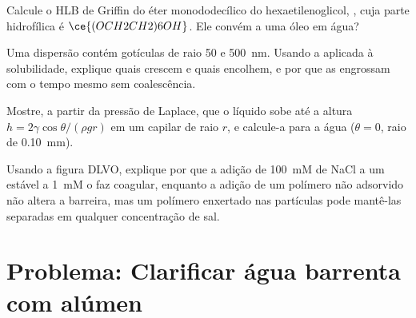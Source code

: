 \begin{exercise}[$\star\star$]\label{exo:b3:colloids:9}
Calcule o HLB de Griffin do éter monododecílico do hexaetilenoglicol,
, cuja parte hidrofílica é $\ce{(OCH2CH2)6OH}$. Ele convém a uma
 óleo em água?
\end{exercise}

\begin{exercise}[$\star\star\star$]\label{exo:b3:colloids:10}
Uma dispersão contém gotículas de raio 50 e \qty{500}{nm}. Usando a 
aplicada à solubilidade, explique quais crescem e quais encolhem, e por que as
 engrossam com o tempo mesmo sem coalescência.
\end{exercise}

\begin{exercise}[$\star\star\star$]\label{exo:b3:colloids:11}
Mostre, a partir da pressão de Laplace, que o líquido sobe até a altura $h = 2\gamma\cos\theta/(\rho gr)$ em um
capilar de raio $r$, e calcule-a para a água ($\theta = 0$, raio de \qty{0.10}{mm}).
\end{exercise}

\begin{exercise}[$\star\star\star$]\label{exo:b3:colloids:12}
Usando a figura DLVO, explique por que a adição de \qty{100}{mM} de NaCl a um  estável
a \qty{1}{mM} o faz coagular, enquanto a adição de um polímero não adsorvido não altera a
barreira, mas um polímero enxertado nas partículas pode mantê-las separadas em qualquer
concentração de sal.
\end{exercise}

\clearpage
\enlargethispage{3\baselineskip}
\section{Problema: Clarificar água barrenta com alúmen}


